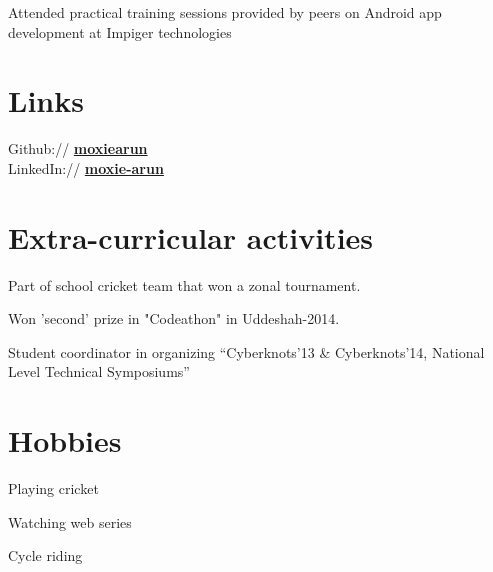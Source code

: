 \documentclass[a4paper]{arun-resume} %
\begin{document}
\begin{minipage}[t]{0.34\textwidth}
Attended practical training sessions provided by peers on Android app development at Impiger technologies

\sectionspace %
 


\section{Links} 

Github:// \href{https://github.com/moxiearun}{\bf moxiearun} \\
LinkedIn:// \href{https://www.linkedin.com/in/moxie-arun/}{\bf moxie-arun} \\

\sectionspace %

\section{Extra-curricular activities} 
\begin{tightitemizespaced}
\item Part of school cricket team that won a zonal tournament.
\item Won 'second' prize in "Codeathon" in Uddeshah-2014.
\item Student coordinator in organizing “Cyberknots'13 \& Cyberknots'14, National Level Technical Symposiums”
\end{tightitemizespaced}

\sectionspace %


\section{Hobbies} 
\begin{tightitemizespaced}
\item Playing cricket
\item Watching web series
\item Cycle riding
\end{tightitemizespaced}

\sectionspace %


\end{minipage} %
\end{document}
